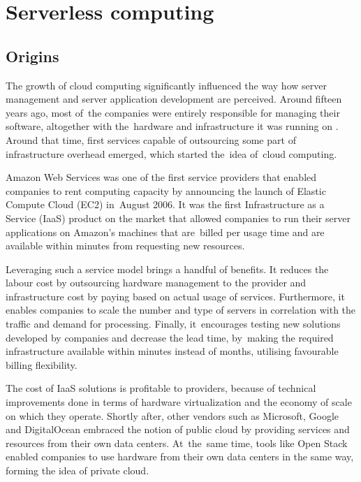\chapter{Serverless computing} \label{chapter:serverless-computing}

\section{Origins} \label{section:serverless-origins}

The growth of cloud computing significantly influenced the way how server management and server application development are perceived. Around fifteen years ago, most of~the companies were entirely responsible for managing their software, altogether with the~hardware and infrastructure it was running on \cite{RobertsChapin2017}. Around that time, first services capable of outsourcing some part of infrastructure overhead emerged, which started the~idea of~cloud computing.

Amazon Web Services was one of the first service providers that enabled companies to rent computing capacity by announcing the launch of Elastic Compute Cloud (EC2) in~August 2006. It was the first Infrastructure as a Service (IaaS) product on the market that allowed companies to run their server applications on Amazon's machines that are~billed per usage time and are available within minutes from requesting new resources.

Leveraging such a service model brings a handful of benefits. It reduces the labour cost by outsourcing hardware management to the provider and infrastructure cost by paying based on actual usage of services. Furthermore, it enables companies to scale the number and type of servers in correlation with the traffic and demand for processing. Finally, it~encourages testing new solutions developed by companies and decrease the lead time, by~making the required infrastructure available within minutes instead of months, utilising favourable billing flexibility.

The cost of IaaS solutions is profitable to providers, because of technical improvements done in terms of hardware virtualization and the economy of scale on which they operate. Shortly after, other vendors such as Microsoft, Google and DigitalOcean embraced the notion of public cloud by providing services and resources from their own data centers. At~the~same time, tools like Open Stack enabled companies to use hardware from their own data centers in the same way, forming the idea of private cloud.

